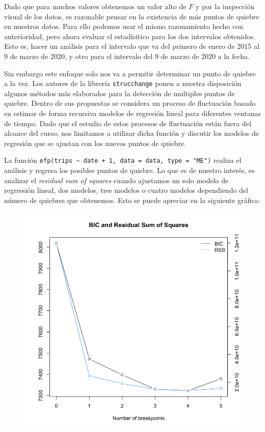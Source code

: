 \documentclass[
]{article}
\begin{document}
Dado que para muchos valores obtenemos un valor alto de \(F\) y por la
inspección visual de los datos, es razonable pensar en la existencia de
más puntos de quiebre en nuestros datos. Para ello podemos usar el mismo
razonamiento hecho con anterioridad, pero ahora evaluar el estadísitico
para los dos intervalos obtenidos. Esto es, hacer un análisis para el
intervalo que va del primero de enero de 2015 al 9 de marzo de 2020, y
otro para el intervalo del 9 de marzo de 2020 a la fecha.

Sin embargo este enfoque solo nos va a permitir determinar un punto de
quiebre a la vez. Los autores de la librería \texttt{strucchange} ponen
a nuestra disposición algunos métodos más elaborados para la detección
de multiples puntos de quiebre. Dentro de sus propuestas se considera un
proceso de fluctuación basado en estimar de forma recursiva modelos de
regresión lineal para diferentes ventanas de tiempo. Dado que el estudio
de estos procesos de fluctuación están fuera del alcance del curso, nos
limitamos a utilizar dicha función y discutir los modelos de regresión
que se ajustan con los nuevos puntos de quiebre.

La función
\texttt{efp(trips\ \textasciitilde{}\ date\ +\ 1,\ data\ =\ data,\ type\ =\ "ME")}
realiza el análisis y regresa los posibles puntos de quiebre. Lo que es
de nuestro interés, es analizar el \emph{residual sum of squares} cuando
ajustamos un solo modelo de regrresión lineal, dos modelos, tres modelos
o cuatro modelos dependiendo del número de quiebres que obtenemos. Esto
se puede apreciar en la siguiente gráfica:

\begin{figure}
\centering
\includegraphics{../plots/structChange_files/structChange_17_3.png}
\caption{}
\end{figure}
\end{document}
